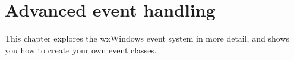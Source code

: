 \chapter{Advanced event handling}\label{chapadvancedevents}
%
%
\setfooter{\thepage}{}{}{}{}{\thepage}%

This chapter explores the wxWindows event system in more detail, and shows you how to
create your own event classes.

